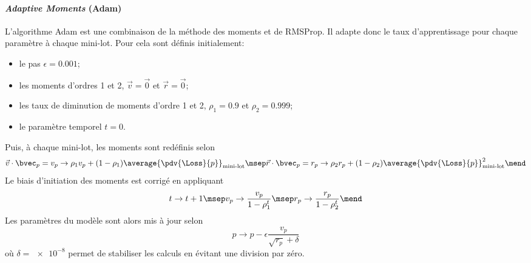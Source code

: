 \paragraph{\emph{Adaptive Moments} (Adam)} \cite{adam,DNN}
L'algorithme Adam
est une combinaison
de la méthode des moments
et
de RMSProp.
Il adapte donc le taux d'apprentissage pour chaque paramètre à chaque mini-lot.
Pour cela sont définis initialement:
\begin{itemize}
\item le pas $\epsilon=\num{0.001}$;
\item les moments d'ordres 1 et 2, $\vec{v}=\vec{0}$ et $\vec{r}=\vec{0}$;
\item les taux de diminution de moments d'ordre 1 et 2, $\rho_1=\num{0.9}$ et $\rho_2=\num{0.999}$;
\item le paramètre temporel $t=0$.
\end{itemize}
Puis, à chaque mini-lot, les moments sont redéfinis selon
\begin{equation}
\vec{v}\cdot\bvec_p =
v_p \to \rho_1 v_p + (1-\rho_1) \average{\pdv{\Loss}{p}}_\text{mini-lot}
\msep
\vec{r}\cdot\bvec_p =
r_p \to \rho_2 r_p + (1-\rho_2) \average{\pdv{\Loss}{p}}_\text{mini-lot}^2
\mend
\end{equation}
Le biais d'initiation des moments est corrigé en appliquant
\begin{equation}
t \to t+1
\msep
v_p \to \frac{v_p}{1-\rho_1^t}
\msep
r_p \to \frac{r_p}{1-\rho_2^t}
\mend
\end{equation}
Les paramètres du modèle sont alors mis à jour selon
\begin{equation}
p \to p - \epsilon \frac{v_p}{\sqrt{r_p}+\delta}
\end{equation}
où
$\delta=\num{e-8}$ permet de stabiliser les calculs en évitant une division par zéro.
